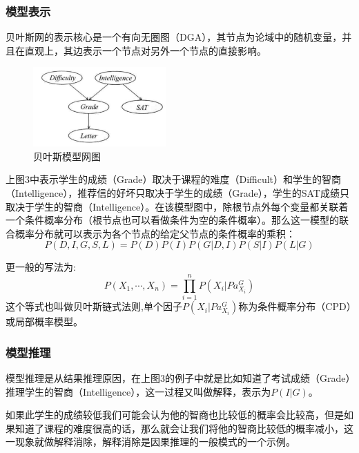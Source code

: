 \documentclass{article} %
\begin{document}
\begin{CJK*}{UTF8}{gkai}
\subsubsection{模型表示}
贝叶斯网的表示核心是一个有向无圈图（DGA），其节点为论域中的随机变量，并且在直观上，其边表示一个节点对另外一个节点的直接影响。

\begin{figure}[h]
\begin{center}

\includegraphics[width=2in]{3.png}

\end{center}
\caption{贝叶斯模型网图}
\end{figure}

上图3中表示学生的成绩（Grade）取决于课程的难度（Difficult）和学生的智商（Intelligence），推荐信的好坏只取决于学生的成绩（Grade），学生的SAT成绩只取决于学生的智商（Intelligence）。在该模型图中，除根节点外每个变量都关联着一个条件概率分布（根节点也可以看做条件为空的条件概率）。那么这一模型的联合概率分布就可以表示为各个节点的给定父节点的条件概率的乘积：
\begin{equation}
P\left( D,I,G,S,L \right )=P\left( D \right )P\left( I \right )P\left( G \vert D,I \right )P\left( S \vert I \right )P\left( L \vert G \right )
\end{equation}

更一般的写法为:
\begin{equation}
P\left( X _{1},\cdots,X _{n} \right )=\prod_{i=1}^n P\left( X _{i} \vert Pa ^{G}_{X _{i}} \right )
\end{equation}
这个等式也叫做贝叶斯链式法则,单个因子$P\left( X _{i} \vert Pa ^{G}_{X _{i}} \right )$称为条件概率分布（CPD）或局部概率模型。

\subsubsection{模型推理}
模型推理是从结果推理原因，在上图3的例子中就是比如知道了考试成绩（Grade）推理学生的智商（Intelligence），这一过程又叫做解释，表示为$P\left( I \vert G \right)$。

如果此学生的成绩较低我们可能会认为他的智商也比较低的概率会比较高，但是如果知道了课程的难度很高的话，那么就会让我们将他的智商比较低的概率减小，这一现象就做解释消除，解释消除是因果推理的一般模式的一个示例。


\end{CJK*}
\end{document}
